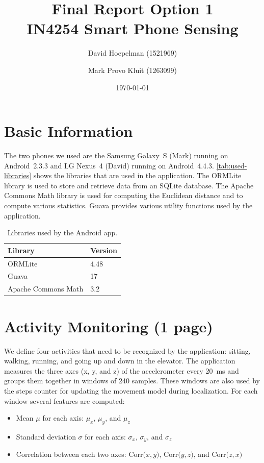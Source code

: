 \documentclass[a4paper,10pt,twoside]{IEEEtran}
\title{\huge{\textbf{Final Report Option 1}\\IN4254 Smart Phone Sensing}}
\date{\today}
\author{David Hoepelman (1521969) \and Mark Provo Kluit (1263099)}
\begin{document}
\maketitle

\newpage
{}


\newpage
{}

\section{Basic Information}
\label{sec:basic-information}
The two phones we used are the Samsung Galaxy~S (Mark) running on Android~2.3.3 and LG Nexus~4 (David) running on Android~4.4.3. \autoref{tab:used-libraries} shows the libraries that are used in the application. The ORMLite library is used to store and retrieve data from an SQLite database. The Apache Commons Math library is used for computing the Euclidean distance and to compute various statistics. Guava provides various utility functions used by the application.

\begin{table}[ht]
\centering
\caption{Libraries used by the Android app.}
\begin{tabular}{ll}
\toprule
Library & Version\\
\midrule
ORMLite & 4.48\\
Guava & 17\\
Apache Commons Math & 3.2\\
\bottomrule
\end{tabular}
\label{tab:used-libraries}
\end{table}

\section{Activity Monitoring (1 page)}
\label{sec:activity-monitoring}
We define four activities that need to be recognized by the application: sitting, walking, running, and going up and down in the elevator. The application measures the three axes (x, y, and z) of the accelerometer every 20~ms and groups them together in windows of 240 samples. These windows are also used by the steps counter for updating the movement model during localization. For each window several features are computed:

\begin{itemize}
\item Mean $\mu$ for each axis: $\mu_x$, $\mu_y$, and $\mu_z$
\item Standard deviation $\sigma$ for each axis: $\sigma_x$, $\sigma_y$, and $\sigma_z$
\item Correlation between each two axes:  $\text{Corr(}x,y{)}$, $\text{Corr(}y,z{)}$, and $\text{Corr(}z,x{)}$
\end{itemize}
\end{document}
